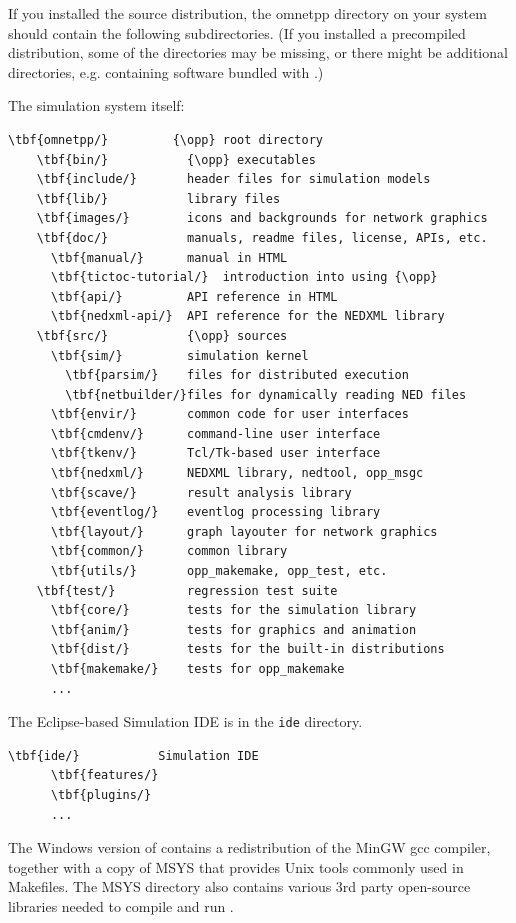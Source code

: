If you installed the source distribution, the omnetpp directory on your system
should contain the following subdirectories. (If you installed a precompiled
distribution, some of the directories may be missing, or there might be
additional directories, e.g. containing software bundled with {\opp}.)

The simulation system itself:

\begin{Verbatim}[commandchars=\\\{\}]
  \tbf{omnetpp/}         {\opp} root directory
    \tbf{bin/}           {\opp} executables
    \tbf{include/}       header files for simulation models
    \tbf{lib/}           library files
    \tbf{images/}        icons and backgrounds for network graphics
    \tbf{doc/}           manuals, readme files, license, APIs, etc.
      \tbf{manual/}      manual in HTML
      \tbf{tictoc-tutorial/}  introduction into using {\opp}
      \tbf{api/}         API reference in HTML
      \tbf{nedxml-api/}  API reference for the NEDXML library
    \tbf{src/}           {\opp} sources
      \tbf{sim/}         simulation kernel
        \tbf{parsim/}    files for distributed execution
        \tbf{netbuilder/}files for dynamically reading NED files
      \tbf{envir/}       common code for user interfaces
      \tbf{cmdenv/}      command-line user interface
      \tbf{tkenv/}       Tcl/Tk-based user interface
      \tbf{nedxml/}      NEDXML library, nedtool, opp_msgc
      \tbf{scave/}       result analysis library
      \tbf{eventlog/}    eventlog processing library
      \tbf{layout/}      graph layouter for network graphics
      \tbf{common/}      common library
      \tbf{utils/}       opp_makemake, opp_test, etc.
    \tbf{test/}          regression test suite
      \tbf{core/}        tests for the simulation library
      \tbf{anim/}        tests for graphics and animation
      \tbf{dist/}        tests for the built-in distributions
      \tbf{makemake/}    tests for opp_makemake
      ...
\end{Verbatim}

The Eclipse-based Simulation IDE is in the \texttt{ide} directory.

\begin{Verbatim}[commandchars=\\\{\}]
    \tbf{ide/}           Simulation IDE
      \tbf{features/}
      \tbf{plugins/}
      ...
\end{Verbatim}

The Windows version of {\opp} contains a redistribution of the MinGW
gcc compiler, together with a copy of MSYS that provides Unix tools
commonly used in Makefiles. The MSYS directory also contains various
3rd party open-source libraries needed to compile and run {\opp}.

